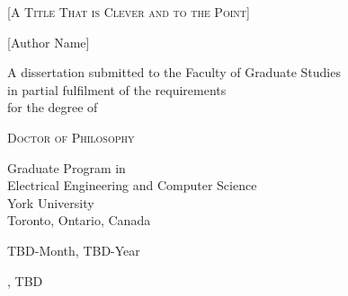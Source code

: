 \begin{center}
  {\scshape\Huge [A Title That is Clever and to the Point] \par}
  \vspace{1cm}
	{\Large [Author Name] \par}
	\vspace{1.5cm}
	{\large A dissertation submitted to the Faculty of Graduate Studies\\
    in partial fulfilment of the requirements \\
    for the degree of\par}
	\vspace{0.8cm}
  {\scshape\Large Doctor of Philosophy \par}
	\vspace{1cm}
	{\large Graduate Program in\\ Electrical Engineering and Computer Science\\
    York University\\
    Toronto, Ontario, Canada\par}
  \vspace{0.5cm}
  {TBD-Month, TBD-Year \par}
  \vfill
  {, TBD \par}
\end{center}

\thispagestyle{empty}
